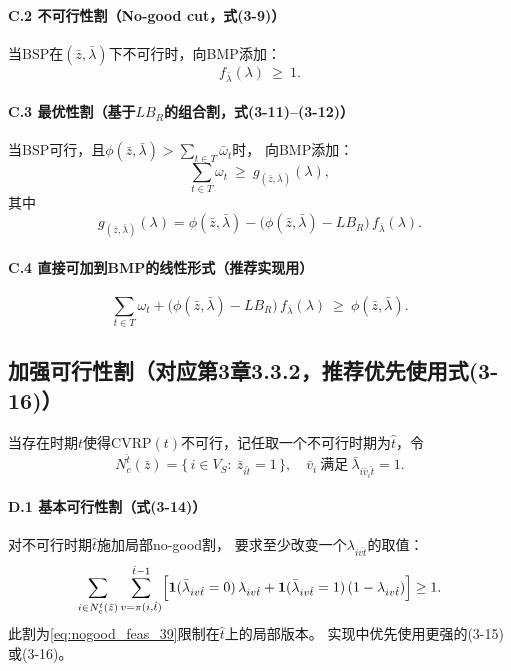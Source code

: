 \documentclass{article}
\begin{document}
\paragraph{C.2 不可行性割（No-good cut，式(3-9)）}
当BSP在$(\bar z,\bar\lambda)$下不可行时，向BMP添加：
\begin{equation}
f_{\bar\lambda}(\lambda)\ \ge\ 1.
\label{eq:nogood_feas_39}
\end{equation}

\paragraph{C.3 最优性割（基于$LB_R$的组合割，式(3-11)--(3-12)）}
当BSP可行，且$\phi(\bar z,\bar\lambda)>\sum_{t\in T}\bar\omega_t$时，
向BMP添加：
\begin{equation}
\sum_{t\in T}\omega_t\ \ge\ g_{(\bar z,\bar\lambda)}(\lambda),
\label{eq:opt_g_311}
\end{equation}
其中
\begin{equation}
g_{(\bar z,\bar\lambda)}(\lambda)
=\phi(\bar z,\bar\lambda)
-\bigl(\phi(\bar z,\bar\lambda)-LB_R\bigr)\,f_{\bar\lambda}(\lambda).
\label{eq:g_def_312}
\end{equation}

\paragraph{C.4 直接可加到BMP的线性形式（推荐实现用）}
\begin{equation}
\sum_{t\in T}\omega_t
+
\bigl(\phi(\bar z,\bar\lambda)-LB_R\bigr)\,f_{\bar\lambda}(\lambda)
\ \ge\
\phi(\bar z,\bar\lambda).
\label{eq:opt_g_linear}
\end{equation}

\subsection{加强可行性割（对应第3章3.3.2，推荐优先使用式(3-16)）}

当存在时期$t$使得CVRP$(t)$不可行，记任取一个不可行时期为$\hat t$，令
\[
N_c^{\hat t}(\bar z)=\{\,i\in V_S:\ \bar z_{i\hat t}=1\,\},
\quad
\bar v_i\ \text{满足}\ \bar\lambda_{i\bar v_i \hat t}=1.
\]

\paragraph{D.1 基本可行性割（式(3-14)）}
对不可行时期$\hat t$施加局部no-good割，
要求至少改变一个$\lambda_{iv\hat t}$的取值：
\begin{equation}
\sum_{i\in N_c^{\hat t}(\bar z)}\sum_{v=\pi(i,\hat t)}^{\hat t-1}
\Bigl[\mathbf{1}(\bar\lambda_{iv\hat t}=0)\,\lambda_{iv\hat t}
+\mathbf{1}(\bar\lambda_{iv\hat t}=1)\,(1-\lambda_{iv\hat t})\Bigr]\ge 1.
\label{eq:feas_314}
\end{equation}
此割为\eqref{eq:nogood_feas_39}限制在$\hat t$上的局部版本。
实现中优先使用更强的(3-15)或(3-16)。
\end{document}
